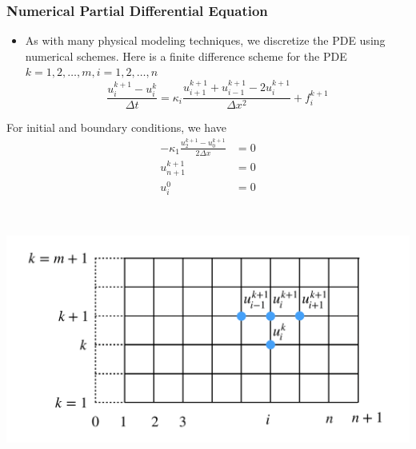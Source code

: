 \documentclass{beamer}
\begin{document}
\begin{frame}
	\frametitle{Numerical Partial Differential Equation}

	\begin{itemize}
		\item As with many physical modeling techniques, we discretize the PDE using numerical schemes. Here is a finite difference scheme for the PDE $k=1,2,\ldots,m, i=1,2,\ldots, n$
		      $$\frac{u^{k+1}_i-u^k_i}{\Delta t} = \kappa_i \frac{u^{k+1}_{i+1}+u^{k+1}_{i-1}-2u^{k+1}_i}{\Delta x^2} + f_i^{k+1}$$
	\end{itemize}
	\begin{minipage}[c]{0.49\textwidth}
		For initial and boundary conditions, we have
		\begin{align*}
			-\kappa_1 \frac{u_2^{k+1}-u_0^{k+1}}{2\Delta x} & = 0 \\
			u_{n+1}^{k+1}                                   & = 0 \\
			u_i^0                                           & = 0
		\end{align*}
	\end{minipage}~
	\begin{minipage}[c]{0.49\textwidth}
		\includegraphics[width=1.0\textwidth]{figures/grid}
	\end{minipage}


\end{frame}
\end{document}
